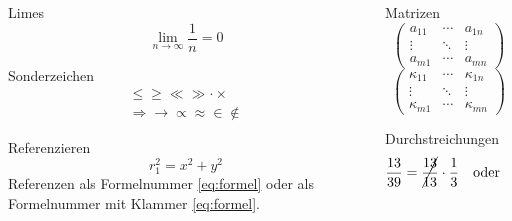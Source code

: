 \documentclass[9pt]{beamer}
\begin{document}
\begin{frame}
	\begin{columns}
		\begin{column}{0.49\textwidth}
			\begin{exampleblock}{Limes}
				\[\lim_{n \to \infty}\frac{1}{n}=0\]
			\end{exampleblock}
			\begin{exampleblock}{Sonderzeichen}
                \begin{align*}
                    \leq \geq \ll \gg \cdot \times\\
                    \Rightarrow \rightarrow \propto \approx \in \not\in
                \end{align*}
			\end{exampleblock}
			\begin{exampleblock}{Referenzieren}
				\begin{equation}
					r_1^2 = x^2 + y^2
					\label{eq:formel}
				\end{equation}
				Referenzen als Formelnummer \ref{eq:formel} oder
				als	Formelnummer mit Klammer \eqref{eq:formel}.
			\end{exampleblock}
		\end{column}
		\begin{column}{0.49\textwidth}
			\begin{exampleblock}{Matrizen}
				\[
					\left(
						\begin{array}{ccc}
							a_{11} & \cdots & a_{1n} \\
							\vdots & \ddots & \vdots \\
							a_{m1} & \cdots & a_{mn}
						\end{array}
					\right)
				\]
				\[
					\begin{pmatrix}
						\kappa_{11} & \cdots & \kappa_{1n} \\
						\vdots      & \ddots & \vdots      \\
						\kappa_{m1} & \cdots & \kappa_{mn}
					\end{pmatrix}
				\]
			\end{exampleblock}
			\begin{exampleblock}{Durchstreichungen}
				\[
					\frac{13}{39} = \cancel{{\frac{13}{13}}} \cdot \frac{1}{3}
					\quad\text{oder}\quad
					\frac{13}{39} = \frac{\cancel{13} \cdot 1}{\cancel{13} \cdot 3}
				\]
			\end{exampleblock}
		\end{column}
	\end{columns}
\end{frame}
\end{document}

